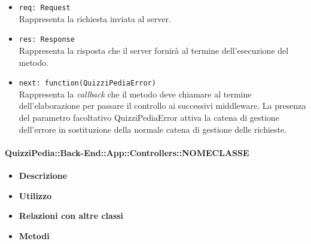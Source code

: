 \begin{itemize}
\begin{itemize}
\begin{itemize}
			\item \texttt{req: Request}\\
			Rappresenta la richiesta inviata al server.
			\item \texttt{res: Response}\\
			Rappresenta la risposta che il server fornirà al termine dell'esecuzione del metodo.
			\item \texttt{next: function(QuizziPediaError)}\\
			Rappresenta la \textit{callback} che il metodo deve chiamare al termine dell’elaborazione per passare il controllo ai successivi middleware. La presenza del parametro facoltativo QuizziPediaError attiva la catena di gestione dell’errore in sostituzione della normale catena di gestione delle richieste.
		\end{itemize}
	\end{itemize}
\end{itemize}
\paragraph{QuizziPedia::Back-End::App::Controllers::NOMECLASSE}
\begin{itemize}
	\item \textbf{Descrizione} \\
	\item \textbf{Utilizzo} \\
	\item \textbf{Relazioni con altre classi} \\
	\item \textbf{Metodi} \\
\end{itemize}